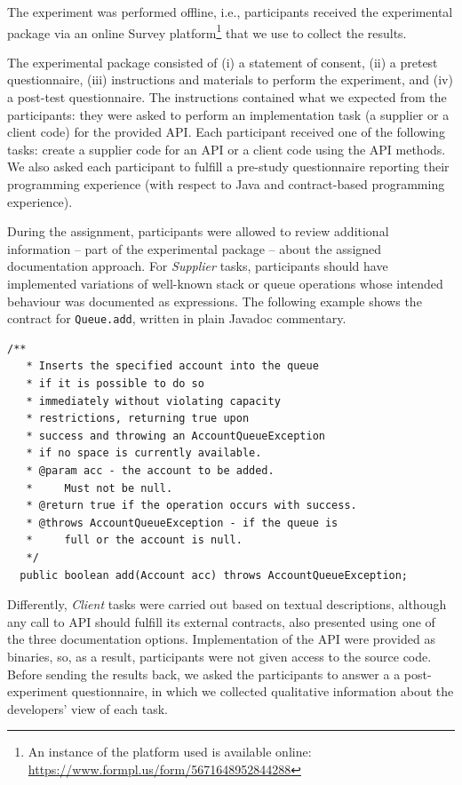 The experiment was performed offline, i.e., participants received the experimental package via an online Survey
platform\footnote{An instance of the platform used is
available online: \url{https://www.formpl.us/form/5671648952844288}} that we use to collect the results.

The experimental package consisted of (i) a statement of consent, (ii) a pretest
questionnaire, (iii) instructions and materials to perform the experiment, and (iv) a post-test
questionnaire. 
The instructions contained what we expected from the participants: they were asked to perform an implementation task (a supplier or a client code) for the
provided API. Each participant received one of the following tasks: create a supplier code for
an API or a client code using the API methods.
We also asked each participant to fulfill a
pre-study questionnaire reporting their programming experience (with respect to Java and contract-based programming experience). 

During the assignment, participants were allowed to review additional information -- part of the experimental package -- about the assigned documentation approach. 
For \textit{Supplier} tasks, participants should have implemented variations of well-known stack or queue operations whose intended behaviour was documented as \contractjdoc{} expressions. The following example shows the contract for \lstinline!Queue.add!, written in plain Javadoc commentary.
\begin{lstlisting}[basicstyle=\footnotesize\ttfamily,name=figxpi, frame=lines, mathescape=true]
/**
   * Inserts the specified account into the queue 
   * if it is possible to do so 
   * immediately without violating capacity 
   * restrictions, returning true upon 
   * success and throwing an AccountQueueException 
   * if no space is currently available.
   * @param acc - the account to be added. 
   *     Must not be null.
   * @return true if the operation occurs with success.
   * @throws AccountQueueException - if the queue is 
   *     full or the account is null.
   */
  public boolean add(Account acc) throws AccountQueueException;
\end{lstlisting}

Differently, \textit{Client} tasks were carried out based on textual descriptions, although any call to API should fulfill its external contracts, also presented using one of the three documentation options. Implementation of the API were provided as binaries, so, as a result, participants were not given access to the source code.
Before sending the results back, we asked the participants to answer a a post-experiment questionnaire, in which we collected qualitative information about the developers' view of each task.

